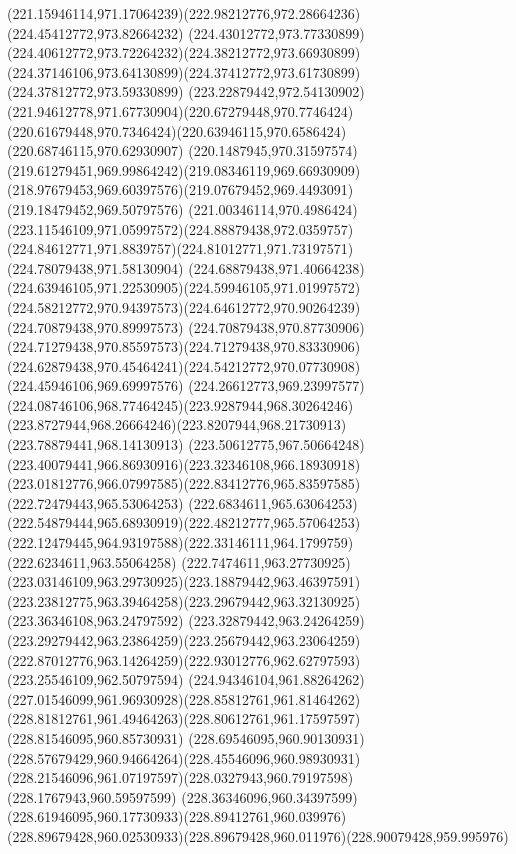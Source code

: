 {{		\curveto(221.15946114,971.17064239)(222.98212776,972.28664236)(224.45412772,973.82664232)
		\curveto(224.43012772,973.77330899)(224.40612772,973.72264232)(224.38212772,973.66930899)
		\curveto(224.37146106,973.64130899)(224.37412772,973.61730899)(224.37812772,973.59330899)
		\curveto(223.22879442,972.54130902)(221.94612778,971.67730904)(220.67279448,970.7746424)
		\curveto(220.61679448,970.7346424)(220.63946115,970.6586424)(220.68746115,970.62930907)
		\curveto(220.1487945,970.31597574)(219.61279451,969.99864242)(219.08346119,969.66930909)
		\curveto(218.97679453,969.60397576)(219.07679452,969.4493091)(219.18479452,969.50797576)
		\curveto(221.00346114,970.4986424)(223.11546109,971.05997572)(224.88879438,972.0359757)
		\curveto(224.84612771,971.8839757)(224.81012771,971.73197571)(224.78079438,971.58130904)
		\curveto(224.68879438,971.40664238)(224.63946105,971.22530905)(224.59946105,971.01997572)
		\curveto(224.58212772,970.94397573)(224.64612772,970.90264239)(224.70879438,970.89997573)
		\curveto(224.70879438,970.87730906)(224.71279438,970.85597573)(224.71279438,970.83330906)
		\curveto(224.62879438,970.45464241)(224.54212772,970.07730908)(224.45946106,969.69997576)
		\curveto(224.26612773,969.23997577)(224.08746106,968.77464245)(223.9287944,968.30264246)
		\curveto(223.8727944,968.26664246)(223.8207944,968.21730913)(223.78879441,968.14130913)
		\curveto(223.50612775,967.50664248)(223.40079441,966.86930916)(223.32346108,966.18930918)
		\curveto(223.01812776,966.07997585)(222.83412776,965.83597585)(222.72479443,965.53064253)
		\curveto(222.6834611,965.63064253)(222.54879444,965.68930919)(222.48212777,965.57064253)
		\curveto(222.12479445,964.93197588)(222.33146111,964.1799759)(222.6234611,963.55064258)
		\curveto(222.7474611,963.27730925)(223.03146109,963.29730925)(223.18879442,963.46397591)
		\curveto(223.23812775,963.39464258)(223.29679442,963.32130925)(223.36346108,963.24797592)
		\curveto(223.32879442,963.24264259)(223.29279442,963.23864259)(223.25679442,963.23064259)
		\curveto(222.87012776,963.14264259)(222.93012776,962.62797593)(223.25546109,962.50797594)
		\curveto(224.94346104,961.88264262)(227.01546099,961.96930928)(228.85812761,961.81464262)
		\curveto(228.81812761,961.49464263)(228.80612761,961.17597597)(228.81546095,960.85730931)
		\curveto(228.69546095,960.90130931)(228.57679429,960.94664264)(228.45546096,960.98930931)
		\curveto(228.21546096,961.07197597)(228.0327943,960.79197598)(228.1767943,960.59597599)
		\curveto(228.36346096,960.34397599)(228.61946095,960.17730933)(228.89412761,960.039976)
		\curveto(228.89679428,960.02530933)(228.89679428,960.011976)(228.90079428,959.995976)
}}
